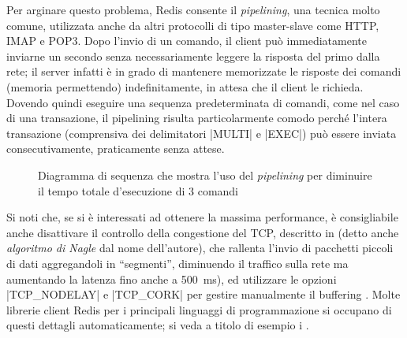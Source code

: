 Per arginare questo problema, Redis consente il \emph{pipelining}, una tecnica molto comune, 
utilizzata anche da altri protocolli di tipo master-slave come HTTP, IMAP e POP3. Dopo l'invio 
di un comando, il client può immediatamente inviarne un secondo senza necessariamente leggere
la risposta del primo dalla rete; il server infatti è in grado di mantenere memorizzate le risposte
dei comandi (memoria permettendo) indefinitamente, in attesa che il client le richieda. Dovendo
quindi eseguire una sequenza predeterminata di comandi, come nel caso di una transazione, il
pipelining risulta particolarmente comodo perché l'intera transazione (comprensiva dei delimitatori
\cverb|MULTI| e \cverb|EXEC|) può essere inviata consecutivamente, praticamente senza attese.

\begin{figure}
	\centering
	\begin{minipage}[t]{0.4\textwidth}
	\end{minipage}
	\qquad
	\begin{minipage}[t]{0.4\textwidth}
	\end{minipage}

	\caption{Diagramma di sequenza che mostra l'uso del \emph{pipelining} per diminuire
		il tempo totale d'e\-se\-cu\-zio\-ne di 3 comandi}
\end{figure}

Si noti che, se si è interessati ad ottenere la massima performance, è consigliabile anche
disattivare il controllo della congestione del TCP, descritto in
\cite{rfc896} (detto anche \emph{algoritmo di Nagle} dal nome
dell'autore), che rallenta l'invio di pacchetti piccoli di dati aggregandoli in ``segmenti'',
diminuendo il traffico sulla rete ma aumentando la latenza fino anche a \SI{500}{\milli\second}), ed
utilizzare le opzioni \cverb|TCP_NODELAY| e \cverb|TCP_CORK| per gestire manualmente il buffering
\cite{tcp-cork}. Molte librerie client Redis per i principali linguaggi di programmazione si
occupano di questi dettagli automaticamente; si veda a titolo di esempio i 
.

